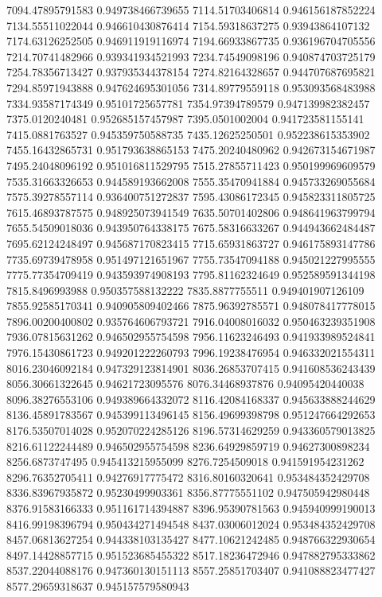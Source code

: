 {7094.47895791583 0.949738466739655
7114.51703406814 0.946156187852224
7134.55511022044 0.946610430876414
7154.59318637275 0.93943864107132
7174.63126252505 0.946911919116974
7194.66933867735 0.936196704705556
7214.70741482966 0.939341934521993
7234.74549098196 0.940874703725179
7254.78356713427 0.937935344378154
7274.82164328657 0.944707687695821
7294.85971943888 0.947624695301056
7314.89779559118 0.953093568483988
7334.93587174349 0.95101725657781
7354.97394789579 0.947139982382457
7375.0120240481 0.952685157457987
7395.0501002004 0.941723581155141
7415.0881763527 0.945359750588735
7435.12625250501 0.952238615353902
7455.16432865731 0.951793638865153
7475.20240480962 0.942673154671987
7495.24048096192 0.951016811529795
7515.27855711423 0.950199969609579
7535.31663326653 0.944589193662008
7555.35470941884 0.945733269055684
7575.39278557114 0.936400751272837
7595.43086172345 0.945823311805725
7615.46893787575 0.948925073941549
7635.50701402806 0.948641963799794
7655.54509018036 0.943950764338175
7675.58316633267 0.944943662484487
7695.62124248497 0.945687170823415
7715.65931863727 0.946175893147786
7735.69739478958 0.951497121651967
7755.73547094188 0.945021227995555
7775.77354709419 0.943593974908193
7795.81162324649 0.952589591344198
7815.8496993988 0.950357588132222
7835.8877755511 0.949401907126109
7855.92585170341 0.940905809402466
7875.96392785571 0.948078417778015
7896.00200400802 0.935764606793721
7916.04008016032 0.950463239351908
7936.07815631262 0.946502955754598
7956.11623246493 0.941933989524841
7976.15430861723 0.949201222260793
7996.19238476954 0.946332021554311
8016.23046092184 0.947329123814901
8036.26853707415 0.941608536243439
8056.30661322645 0.94621723095576
8076.34468937876 0.94095420440038
8096.38276553106 0.949389664332072
8116.42084168337 0.945633888244629
8136.45891783567 0.945399113496145
8156.49699398798 0.951247664292653
8176.53507014028 0.952070224285126
8196.57314629259 0.943360579013825
8216.61122244489 0.946502955754598
8236.64929859719 0.94627300898234
8256.6873747495 0.945413215955099
8276.7254509018 0.941591954231262
8296.76352705411 0.94276917775472
8316.80160320641 0.953484352429708
8336.83967935872 0.95230499903361
8356.87775551102 0.947505942980448
8376.91583166333 0.951161714394887
8396.95390781563 0.945940999190013
8416.99198396794 0.950434271494548
8437.03006012024 0.953484352429708
8457.06813627254 0.944338103135427
8477.10621242485 0.948766322930654
8497.14428857715 0.951523685455322
8517.18236472946 0.947882795333862
8537.22044088176 0.947360130151113
8557.25851703407 0.941088823477427
8577.29659318637 0.945157579580943
}
